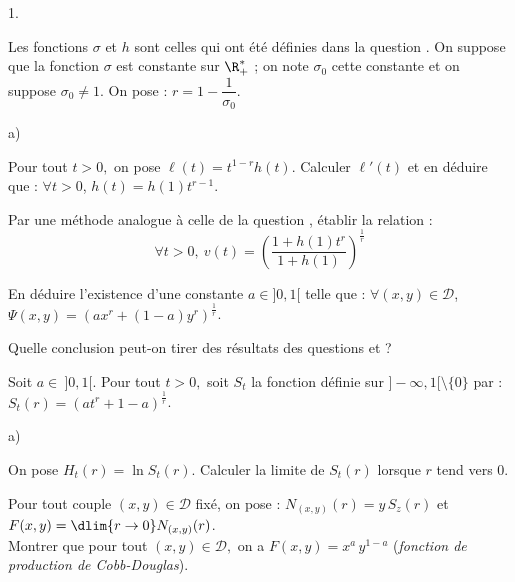 \documentclass[11pt]{article}%
\begin{document}
\begin{noliste}{1.}
 
 
 \item Les fonctions $\sigma$ et $h$ sont celles qui ont été définies 
 dans la question . On suppose que la fonction $\sigma$ est 
 constante sur $\R_+^*$ ; on note $\sigma_0$ cette constante et on 
 suppose $\sigma_0 \neq 1$. On pose : $r=1-\dfrac{1}{\sigma_0}$.
 \begin{noliste}{a)}
  \setlength{\itemsep}{2mm}
  \item\label{7a} Pour tout $t>0,$ on pose $\ell(t)=t^{1-r}h(t)$.
  Calculer $\ell'(t)$ et en déduire que : $\forall t >0$, 
  $h(t)=h(1)t^{r-1}$.
  
  

  
  \item Par une méthode analogue à celle de la question , 
  établir la relation : 
  \[
  \forall t >0, \  
  v(t)=\left(\dfrac{1+h(1)t^r}{1+h(1)}\right)^{\frac{1}{r}}
  \]
  
  

  
  \item\label{7c} En déduire l'existence d'une constante $a \in ]0,1[$ 
  telle que : $\forall (x,y) \in \mathcal{D}$, 
  $\Psi(x,y)=\left(ax^r+(1-a)y^r\right)^{\frac{1}{r}}$.
  
  
  
  
  
  
  
  
  

  
  \item Quelle conclusion peut-on tirer des résultats des questions 
  \itbf{3.b)} et \itbf{7.c)} ?
  
  
 \end{noliste}
 
 \item Soit $a \in \ ]0,1[$. Pour tout $t>0,$ soit $S_t$ la fonction 
 définie sur $]-\infty,1[ \setminus \{0\}$ par : 
 $S_t(r)=(at^r+1-a)^{\frac{1}{r}}$.
 \begin{noliste}{a)}
  \setlength{\itemsep}{2mm}
  \item On pose $H_t(r)=\ln S_t(r)$. Calculer la limite de $S_t(r)$ 
  lorsque $r$ tend vers 0.
  
  
  
  
  
  
  
  
  

  
  \item Pour tout couple $(x,y) \in \mathcal{D}$ fixé, on pose : 
  $N_{(x,y)}(r) = y \, S_z(r)$ et $F(x,y)=\dlim{r \to 0} 
  N_{(x,y)}(r)$.\\
  Montrer que pour tout $(x,y) \in \mathcal{D},$ on a 
  $F(x,y)=x^a \, y^{1-a}$ ({\it fonction de production de 
  Cobb-Douglas}).
  
  
 \end{noliste}
\end{noliste}
\end{document}
